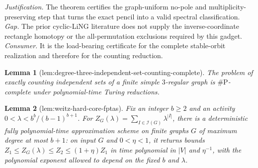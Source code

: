\documentclass{article}
\newtheorem{lemma}{Lemma}
\begin{document}
\par\smallskip\noindent \textit{Justification.} The theorem certifies the graph-uniform no-pole and multiplicity-preserving step that turns the exact pencil into a valid spectral classification. \textit{Gap.} The prior cyclic-LiNG literature does not supply the inverse-coordinate rectangle homotopy or the all-permutation exclusions required by this gadget. \textit{Consumer.} It is the load-bearing certificate for the complete stable-orbit realization and therefore for the counting reduction.

\begin{lemma}[lem:degree-three-independent-set-counting-complete]\label{lem:degree-three-independent-set-counting-complete}
The problem of exactly counting independent sets of a finite simple \(3\)-regular graph is \(\#\mathrm P\)-complete under polynomial-time Turing reductions.
\end{lemma}

\begin{lemma}[lem:weitz-hard-core-fptas]\label{lem:weitz-hard-core-fptas}
Fix an integer \(b\geq2\) and an activity \(0<\lambda<b^b/(b-1)^{b+1}\).  For \(Z_G(\lambda)=\sum_{I\in\mathcal I(G)}\lambda^{|I|}\), there is a deterministic fully polynomial-time approximation scheme on finite graphs \(G\) of maximum degree at most \(b+1\): on input \(G\) and \(0<\eta<1\), it returns bounds \(Z_1\leq Z_G(\lambda)\leq Z_2\leq(1+\eta)Z_1\) in time polynomial in \(|V|\) and \(\eta^{-1}\), with the polynomial exponent allowed to depend on the fixed \(b\) and \(\lambda\).
\end{lemma}
\end{document}
